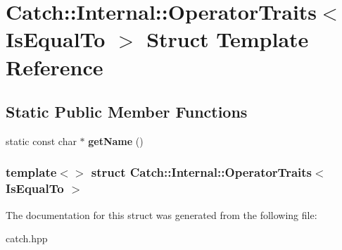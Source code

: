 \hypertarget{structCatch_1_1Internal_1_1OperatorTraits_3_01IsEqualTo_01_4}{
\section{Catch::Internal::OperatorTraits$<$ IsEqualTo $>$ Struct Template Reference}
\label{structCatch_1_1Internal_1_1OperatorTraits_3_01IsEqualTo_01_4}
}
\subsection*{Static Public Member Functions}
\begin{DoxyCompactItemize}
\item 
\hypertarget{structCatch_1_1Internal_1_1OperatorTraits_3_01IsEqualTo_01_4_addf03ac66f0ed83abcc037a7a327d4f1}{
static const char $\ast$ {\bfseries getName} ()}
\label{structCatch_1_1Internal_1_1OperatorTraits_3_01IsEqualTo_01_4_addf03ac66f0ed83abcc037a7a327d4f1}

\end{DoxyCompactItemize}
\subsubsection*{template$<$$>$ struct Catch::Internal::OperatorTraits$<$ IsEqualTo $>$}



The documentation for this struct was generated from the following file:\begin{DoxyCompactItemize}
\item 
catch.hpp\end{DoxyCompactItemize}
